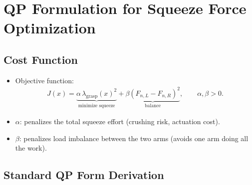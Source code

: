 \documentclass[conference]{IEEEtran}
\begin{document}
\section*{QP Formulation for Squeeze Force Optimization}

\subsection*{Cost Function}
\begin{itemize}
    \item Objective function:
    \begin{align}
        J(x)
        =
        \underbrace{\alpha\,\lambda_{\mathrm{grasp}}(x)^2}_{\text{minimize squeeze}}
        +
        \underbrace{\beta\left(F_{n,L}-F_{n,R}\right)^2}_{\text{balance}},
        \qquad
        \alpha,\beta>0.
    \end{align}

    \item \(\alpha\): penalizes the total squeeze effort (crushing risk, actuation cost).

    \item \(\beta\): penalizes load imbalance between the two arms (avoids one arm doing all the work).
\end{itemize}

\subsection*{Standard QP Form Derivation}
\end{document}

